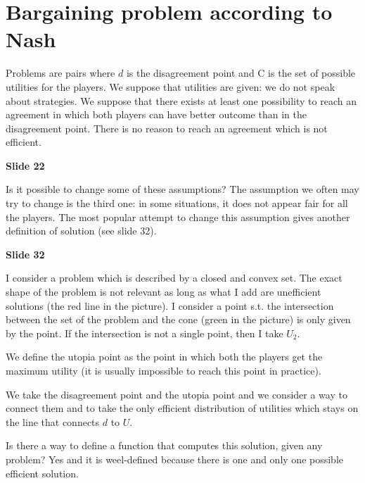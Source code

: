 
%


\section{Bargaining problem according to Nash}

\bigskip
\noindent Problems are pairs where $d$ is the disagreement point and C is the 
set of possible utilities for the players. We suppose that utilities are given: 
we do not speak about strategies. We suppose that there exists at least one 
possibility to reach an agreement in which both players can have better 
outcome than in the disagreement point. There is no reason to reach an 
agreement which is not efficient.

\bigskip
\noindent \textbf{Slide 22}

\noindent Is it possible to change some of these assumptions? The assumption 
we often may try to change is the third one: in some situations, it does not 
appear fair for all the players. The most popular attempt to change this 
assumption gives another definition of solution (see slide 32).

\bigskip
\noindent \textbf{Slide 32}

\noindent I consider a problem which is described by a closed and convex set. 
The exact shape of the problem is not relevant as long as what I add are 
unefficient solutions (the red line in the picture). I consider a point s.t. 
the intersection between the set of the problem and the cone (green in the 
picture) is only given by the point. If the intersection is not a single point, 
then I take $U_2$.

\noindent We define the utopia point as the point in which both the players get 
the maximum utility (it is usually impossible to reach this point in practice). 

\noindent We take the disagreement point and the utopia point and we consider 
a way to connect them and to take the only efficient distribution of utilities 
which stays on the line that connects $d$ to $U$.

\noindent Is there a way to define a function that computes this solution, 
given any problem? Yes and it is weel-defined because there is one and only 
one possible efficient solution.

